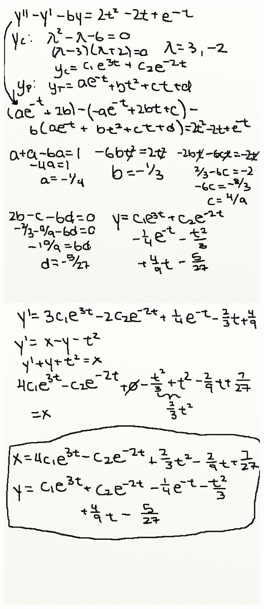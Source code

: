 \documentclass{article}
\begin{document}
\includegraphics[width=\textwidth,height=\textheight,keepaspectratio]{homework7q4p3.png}\clearpage{}
\includegraphics[width=\textwidth,height=\textheight,keepaspectratio]{homework7q4p4.png}\clearpage{}
\end{document}
